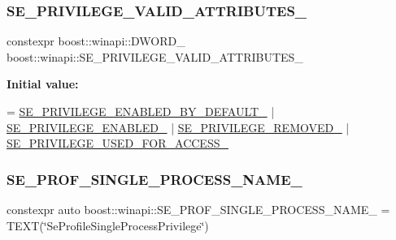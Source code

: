 \subsubsection{\texorpdfstring{S\+E\+\_\+\+P\+R\+I\+V\+I\+L\+E\+G\+E\+\_\+\+V\+A\+L\+I\+D\+\_\+\+A\+T\+T\+R\+I\+B\+U\+T\+E\+S\+\_\+}{SE\_PRIVILEGE\_VALID\_ATTRIBUTES\_}}
{\footnotesize\ttfamily constexpr boost\+::winapi\+::\+D\+W\+O\+R\+D\+\_\+ boost\+::winapi\+::\+S\+E\+\_\+\+P\+R\+I\+V\+I\+L\+E\+G\+E\+\_\+\+V\+A\+L\+I\+D\+\_\+\+A\+T\+T\+R\+I\+B\+U\+T\+E\+S\+\_\+}

{\bfseries Initial value\+:}
\begin{DoxyCode}
=
        \mbox{\hyperlink{namespaceboost_1_1winapi_a6b5da96c8f385161dc17a99234cd8c7f}{SE\_PRIVILEGE\_ENABLED\_BY\_DEFAULT\_}} | 
      \mbox{\hyperlink{namespaceboost_1_1winapi_a8691d65b7c61401a15be2dea40202334}{SE\_PRIVILEGE\_ENABLED\_}} |
        \mbox{\hyperlink{namespaceboost_1_1winapi_a90fdf769b75dfe0481c21acde1080f73}{SE\_PRIVILEGE\_REMOVED\_}} | 
      \mbox{\hyperlink{namespaceboost_1_1winapi_a048b4f29ba154f8b36f3c942b8977da6}{SE\_PRIVILEGE\_USED\_FOR\_ACCESS\_}}
\end{DoxyCode}
\mbox{\label{namespaceboost_1_1winapi_ad2afe2d90887ceb14d6f0317cadd0be0}} 
\subsubsection{\texorpdfstring{S\+E\+\_\+\+P\+R\+O\+F\+\_\+\+S\+I\+N\+G\+L\+E\+\_\+\+P\+R\+O\+C\+E\+S\+S\+\_\+\+N\+A\+M\+E\+\_\+}{SE\_PROF\_SINGLE\_PROCESS\_NAME\_}}
{\footnotesize\ttfamily constexpr auto boost\+::winapi\+::\+S\+E\+\_\+\+P\+R\+O\+F\+\_\+\+S\+I\+N\+G\+L\+E\+\_\+\+P\+R\+O\+C\+E\+S\+S\+\_\+\+N\+A\+M\+E\+\_\+ = T\+E\+XT(\char`\"{}Se\+Profile\+Single\+Process\+Privilege\char`\"{})}

\mbox{\label{namespaceboost_1_1winapi_ac0b494d146c544a2a50663fc0347e25a}} 
